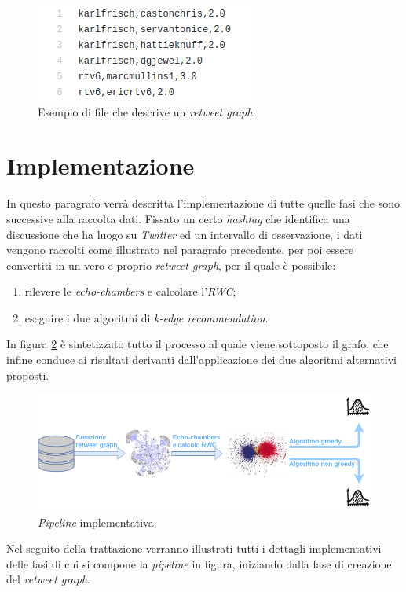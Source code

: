 \begin{figure}
\begin{center}
\includegraphics[scale=0.6]{images/retweet_input_file.png}
\end{center}
\caption{Esempio di file che descrive un \textit{retweet graph}.}
\label{fig:retweet_file}
\end{figure}

\section{Implementazione}
In questo paragrafo verrà descritta l'implementazione di tutte quelle fasi che sono successive alla raccolta dati. Fissato un certo \textit{hashtag} che identifica una discussione che ha luogo su \textit{Twitter} ed un intervallo di osservazione, i dati vengono raccolti come illustrato nel paragrafo precedente, per poi essere convertiti in un vero e proprio \textit{retweet graph}, per il quale è possibile:
\begin{enumerate}
\item rilevere le \textit{echo-chambers} e calcolare l'\textit{RWC};
\item eseguire i due algoritmi di \textit{k-edge recommendation}.
\end{enumerate}
In figura \ref{fig:pipe} è sintetizzato tutto il processo al quale viene sottoposto il grafo, che infine conduce ai risultati derivanti dall'applicazione dei due algoritmi alternativi proposti.

\begin{figure}
\begin{center}
\includegraphics[scale=0.56]{images/pipeline_implementazione.png}
\end{center}
\caption{\textit{Pipeline} implementativa.}
\label{fig:pipe}
\end{figure}
Nel seguito della trattazione verranno illustrati tutti i dettagli implementativi delle fasi di cui si compone la \textit{pipeline} in figura, iniziando dalla fase di creazione del \textit{retweet graph}.

